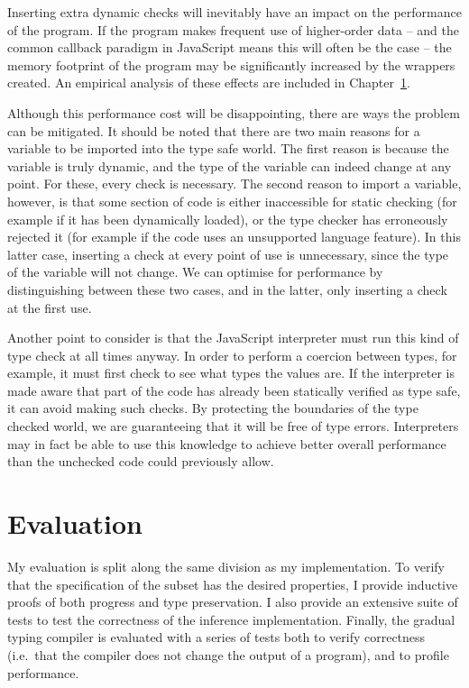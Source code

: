 \documentclass[12pt,a4paper,twoside,openright]{report}
\theoremstyle{definition}
\theoremstyle{dotless}
\begin{document}
Inserting extra dynamic checks will inevitably have an impact on the
performance of the program. If the program makes frequent use of higher-order
data -- and the common callback paradigm in JavaScript means this will often be
the case -- the memory footprint of the program may be significantly increased
by the wrappers created. An empirical analysis of these effects are included in
Chapter~\ref{evaluation}.

Although this performance cost will be disappointing, there are ways the
problem can be mitigated. It should be noted that there are two main reasons
for a variable to be imported into the type safe world. The first reason is
because the variable is truly dynamic, and the type of the variable can indeed
change at any point. For these, every check is necessary. The second reason to
import a variable, however, is that some section of code is either inaccessible
for static checking (for example if it has been dynamically loaded), or the
type checker has erroneously rejected it (for example if the code uses an
unsupported language feature). In this latter case, inserting a check at every
point of use is unnecessary, since the type of the variable will not change. We
can optimise for performance by distinguishing between these two cases, and in
the latter, only inserting a check at the first use.

Another point to consider is that the JavaScript interpreter must run this kind
of type check at all times anyway. In order to perform a coercion between
types, for example, it must first check to see what types the values are. If
the interpreter is made aware that part of the code has already been statically
verified as type safe, it can avoid making such checks. By protecting the
boundaries of the type checked world, we are guaranteeing that it will be free
of type errors. Interpreters may in fact be able to use this knowledge to
achieve better overall performance than the unchecked code could previously
allow.

\chapter{Evaluation}\label{evaluation}

My evaluation is split along the same division as my implementation. To verify
that the specification of the subset has the desired properties, I provide
inductive proofs of both progress and type preservation.  I also provide an
extensive suite of tests to test the correctness of the inference
implementation. Finally, the gradual typing compiler is evaluated with a series
of tests both to verify correctness (i.e.~that the compiler does not change the
output of a program), and to profile performance.
\end{document}
